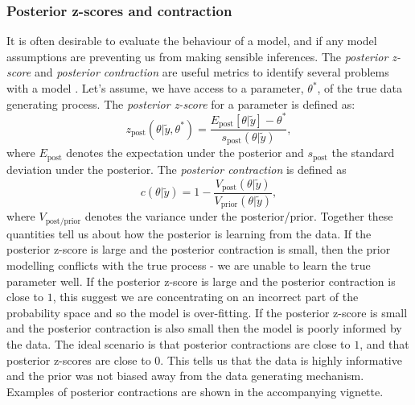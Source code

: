 \documentclass[12pt,english, journal=jpr, layout=twocolumn]{article}
\begin{document}
\subsubsection{Posterior z-scores and contraction}
It is often desirable to evaluate the behaviour of a model, and if any model assumptions are preventing us from making sensible inferences. The \textit{posterior z-score} and \textit{posterior contraction} are useful metrics to identify several problems with a model \citep{Betancourt::2021}. Let's assume, we have access to a parameter, $\theta^*$, of the true data generating process. The \textit{posterior z-score} for a parameter is defined as:
\begin{equation}
z_{\text{post}}(\theta|\tilde{y}, \theta^*) = \frac{E_{\text{post}}[\theta|\tilde{y}] - \theta^*}{s_{\text{post}}(\theta|\tilde{y})},
\end{equation}
where $E_{\text{post}}$ denotes the expectation under the posterior and $s_{\text{post}}$ the standard deviation under the posterior. The \textit{posterior contraction} is defined as
\begin{equation}
c(\theta|\tilde{y}) = 1 - \frac{V_\text{post}(\theta|\tilde{y})}{V_\text{prior}(\theta|\tilde{y})},
\end{equation}
where $V_\text{post/prior}$ denotes the variance under the posterior/prior. Together these quantities tell us about how the posterior is learning from the data. If the posterior z-score is large and the posterior contraction is small, then the prior modelling conflicts with the true process - we are unable to learn the true parameter well. If the posterior z-score is large and the posterior contraction is close to $1$, this suggest we are concentrating on an incorrect part of the probability space and so the model is over-fitting. If the posterior z-score is small and the posterior contraction is also small then the model is poorly informed by the data. The ideal scenario is that posterior contractions are close to $1$, and that posterior z-scores are close to $0$. This tells us that the data is highly informative and the prior was not biased away from the data generating mechanism. Examples of posterior contractions are shown in the accompanying vignette.
\end{document}
